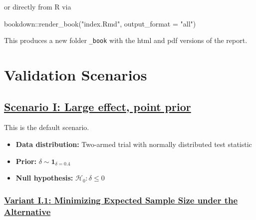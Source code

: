 \documentclass[
]{book}
\newenvironment{Shaded}{\begin{snugshade}}{\end{snugshade}}
\newcommand{\AttributeTok}[1]{\textcolor[rgb]{0.77,0.63,0.00}{#1}}
\newcommand{\FunctionTok}[1]{\textcolor[rgb]{0.00,0.00,0.00}{#1}}
\newcommand{\NormalTok}[1]{#1}
\newcommand{\SpecialCharTok}[1]{\textcolor[rgb]{0.00,0.00,0.00}{#1}}
\newcommand{\StringTok}[1]{\textcolor[rgb]{0.31,0.60,0.02}{#1}}
\providecommand{\tightlist}{%
  \setlength{\itemsep}{0pt}\setlength{\parskip}{0pt}}
\begin{document}
or directly from R via

\begin{Shaded}
\begin{Highlighting}[]
\NormalTok{bookdown}\SpecialCharTok{::}\FunctionTok{render\_book}\NormalTok{(}\StringTok{"index.Rmd"}\NormalTok{, }\AttributeTok{output\_format =} \StringTok{"all"}\NormalTok{)}
\end{Highlighting}
\end{Shaded}

This produces a new folder \texttt{\_book} with the html and pdf versions
of the report.

\hypertarget{validation-scenarios}{%
\section{Validation Scenarios}\label{validation-scenarios}}

\hypertarget{scenario-i-large-effect-point-prior}{%
\subsection{\texorpdfstring{\protect\hyperlink{scenarioI}{Scenario I: Large effect, point prior}}{Scenario I: Large effect, point prior}}\label{scenario-i-large-effect-point-prior}}

This is the default scenario.

\begin{itemize}
\tightlist
\item
  \textbf{Data distribution:} Two-armed trial with normally distributed test statistic
\item
  \textbf{Prior:} \(\delta\sim\textbf{1}_{\delta=0.4}\)
\item
  \textbf{Null hypothesis:} \(\mathcal{H}_0:\delta \leq 0\)
\end{itemize}

\hypertarget{variant-i.1-minimizing-expected-sample-size-under-the-alternative}{%
\subsubsection{\texorpdfstring{\protect\hyperlink{variantI_1}{Variant I.1: Minimizing Expected Sample Size under the Alternative}}{Variant I.1: Minimizing Expected Sample Size under the Alternative}}\label{variant-i.1-minimizing-expected-sample-size-under-the-alternative}}
\end{document}
